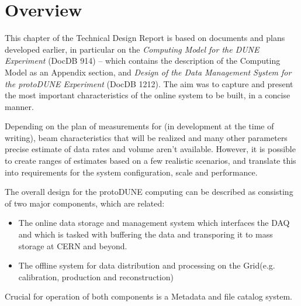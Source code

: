 \section{Overview}

This chapter of the Technical Design Report is based on documents and plans developed earlier, in particular
on the \textit{Computing Model for the DUNE Experiment} (DocDB 914) -- which contains the description
of the \pd Computing Model as an Appendix section, and \textit{Design of the Data Management System for the protoDUNE Experiment}
(DocDB 1212). The aim was to capture and present the most important characteristics of the online system to be built, in a concise manner.

Depending on the plan of measurements for \pd
(in development at the time of writing), beam characteristics that will be realized
and many other parameters precise estimate of data rates and volume aren't available. However, it is possible to create ranges
of estimates based on a few realistic scenarios, and translate this into requirements for the system configuration, scale and
performance.

The overall design for the protoDUNE computing can be described as consisting of two major components, which are related:
\begin{itemize}
\item The online data storage and management system which interfaces the DAQ and which is tasked with buffering
the data and transporing it to mass storage at CERN and beyond.
\item The offline system for data distribution and processing on the Grid(e.g. calibration, production and reconstruction)
\end{itemize}

\noindent Crucial for operation of both components is a Metadata and file catalog system.


